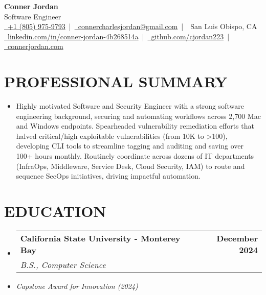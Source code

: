 \documentclass[letterpaper,10pt]{article}
\makeatletter
\newcommand{\resumeSubHeadingListStart}{\begin{itemize}[leftmargin=0in,label={}]}
\newcommand{\resumeSubHeadingListEnd}{\end{itemize}}
\newcommand{\resumeSubheading}[4]{%
  \vspace{-2pt}\item
  \begin{tabular*}{\textwidth}[t]{l@{\extracolsep{\fill}}r}
    \textbf{\large #1} & \textbf{\small #2} \\
    \textit{\large #3} & \textit{\small #4} \\
  \end{tabular*}\vspace{-2pt}
}
\makeatother
\begin{document}
\begin{center}
  {\Huge \textbf{Conner Jordan}}\\[0pt]  %
  {\Large Software Engineer}\\[0pt]  %
  \href{tel:+18059759793}{\faPhone\ +1 (805) 975-9793} \,|\, 
  \href{mailto:connercharlesjordan@gmail.com}{\faEnvelope\ connercharlesjordan@gmail.com} \,|\, 
  \faMapMarker\ San Luis Obispo, CA \\[-2pt]  %
  \href{https://www.linkedin.com/in/conner-jordan-4b268514a/}{\faLinkedin\ linkedin.com/in/conner-jordan-4b268514a}
  \,|\, \href{https://github.com/cjordan223}{\faGithub\ github.com/cjordan223}
  \,|\, \href{https://connerjordan.com/}{\faGlobe\ connerjordan.com}
\end{center}

\vspace{4pt}  %

\section{PROFESSIONAL SUMMARY}
\vspace{6pt}  %
\resumeSubHeadingListStart
\item \small{
Highly motivated Software and Security Engineer with a strong software engineering background, securing and automating workflows across 2,700 Mac and Windows endpoints. Spearheaded vulnerability remediation efforts that halved critical/high exploitable vulnerabilities (from 10K to >100), developing CLI tools to streamline tagging and auditing and saving over 100+ hours monthly. Routinely coordinate across dozens of IT departments (InfraOps, Middleware, Service Desk, Cloud Security, IAM) to route and sequence SecOps initiatives, driving impactful automation.
}
\resumeSubHeadingListEnd
\vspace{6pt}  %

\section{EDUCATION}
\vspace{8pt}  %
\resumeSubHeadingListStart
  \resumeSubheading
    {California State University - Monterey Bay}{December 2024}
    {B.S., Computer Science}{}
  \item \small{\textit{Capstone Award for Innovation (2024)}}
\resumeSubHeadingListEnd
\vspace{6pt}  %
\end{document}
